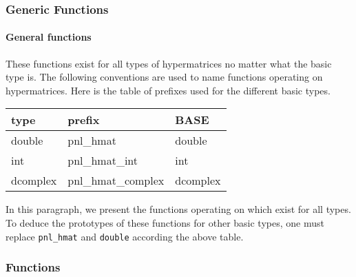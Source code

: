 \subsubsection{Generic Functions}
\paragraph{General functions}
These functions exist for all types of hypermatrices no matter what the basic type
is. The following conventions are used to name functions operating on hypermatrices.
Here is the table of prefixes used for the different basic types.

\begin{center}
  \begin{tabular}[t]{lll}
    type & prefix & BASE\\
    \hline
    double & pnl_hmat & double \\
    \hline
    int & pnl_hmat_int & int \\
    \hline
    dcomplex & pnl_hmat_complex & dcomplex
  \end{tabular}
\end{center}

In this paragraph, we present the functions operating on 
which exist for all types. To deduce the prototypes of these functions for
other basic types, one must replace {\tt pnl_hmat} and {\tt double} according
the above table.


\subsubsection{Functions}

